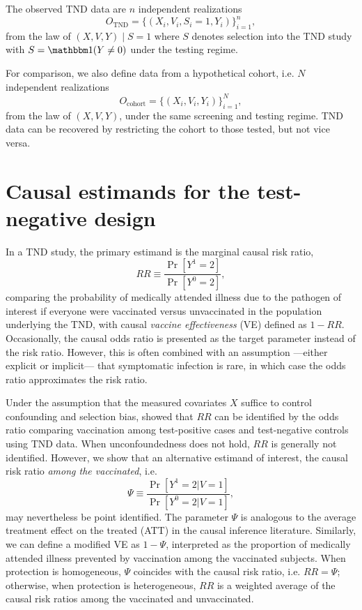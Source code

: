 \documentclass[11pt]{article}
\begin{document}
The observed TND data are $n$ independent realizations 
$$O_{\text{TND}} = \{(X_i, V_i, S_i = 1, Y_i)\}_{i=1}^n,$$
from the law of $(X, V, Y) \mid S = 1$ where $S$ denotes selection into the TND study with $S = \mathbbm 1(Y \neq 0)$ under the testing regime.

For comparison, we also define data from a hypothetical cohort, i.e. $N$ independent realizations 
$$O_{\text{cohort}} = \{(X_i, V_i, Y_i)\}_{i=1}^N,$$
from the law of $(X, V, Y)$, under the same screening and testing regime. TND data can be recovered by restricting the cohort to those tested, but not vice versa. 

\section*{Causal estimands for the test-negative design} \label{sec:estimands}
In a TND study, the primary estimand is the marginal causal risk ratio,
\begin{equation*}
    RR \equiv \dfrac{\Pr[Y^1 = 2]}{\Pr[Y^0 = 2]},
\end{equation*}
comparing the probability of medically attended illness due to the pathogen of interest if everyone were vaccinated versus unvaccinated in the population underlying the TND, with causal \textit{vaccine effectiveness} (VE) defined as $1 - RR$. Occasionally, the causal odds ratio is  presented as the target parameter instead of the risk ratio. However, this is often combined with an assumption ---either explicit or implicit--- that symptomatic infection is rare, in which case the odds ratio approximates the risk ratio. 

Under the assumption that the measured covariates $X$ suffice to control confounding and selection bias,  \cite{schnitzer_estimands_2022} showed that $RR$ can be identified by the odds ratio comparing vaccination among test-positive cases and test-negative controls using TND data. When unconfoundedness does not hold, $RR$ is generally not identified. However, we show that an alternative estimand of interest, the causal risk ratio \textit{among the vaccinated}, i.e.
\begin{equation*}
    \Psi \equiv \dfrac{\Pr[Y^1=2 | V = 1]}{\Pr[Y^0 = 2 | V = 1]},
\end{equation*}
may nevertheless be point identified. The parameter $\Psi$ is analogous to the average treatment effect on the treated (ATT) in the causal inference literature. Similarly, we can define a modified VE as $1-\Psi$, interpreted as the proportion of medically attended illness prevented by vaccination among the vaccinated subjects. When protection is homogeneous, $\Psi$ coincides with the causal risk ratio, i.e. $RR = \Psi$; otherwise, when protection is heterogeneous, $RR$ is a weighted average of the causal risk ratios among the vaccinated and unvaccinated. 
\end{document}
